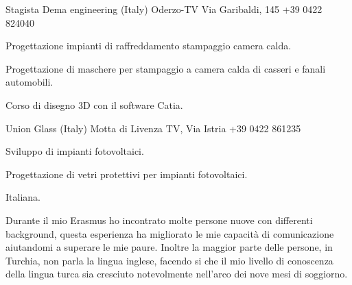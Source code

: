 \documentclass[italian,a4paper]{europasscv}
\begin{document}
\begin{europasscv}
		 {
			Stagista
		}
		\ecvitem{} {
			Dema engineering (Italy) Oderzo-TV Via Garibaldi, 145
			\newline +39 0422 824040
			\newline {}
		}
		\ecvitem{} {
			\begin{ecvitemize}
				\item Progettazione impianti di raffreddamento stampaggio
					camera calda.
				\item Progettazione di maschere per stampaggio a camera calda di
					casseri e fanali automobili.
				\item Corso di disegno 3D con il software Catia.
			\end{ecvitemize}
		}

		\ecvitem{} {
			Union Glass (Italy) Motta di Livenza TV, Via Istria
			\newline +39 0422 861235
			\newline {}
		}

		\ecvitem{} {
			\begin{ecvitemize}
				\item Sviluppo di impianti fotovoltaici.
				\item Progettazione di vetri protettivi per impianti
					fotovoltaici.
			\end{ecvitemize}
		}



		 {
			Italiana.
		}
		\ecvlanguageheader
		\ecvlanguagefooter

		 {
			\begin{ecvitemize}
				\item Durante il mio Erasmus ho incontrato molte persone nuove
					con differenti background, questa esperienza ha migliorato
					le mie capacità di comunicazione aiutandomi a superare le
					mie paure.  Inoltre la maggior parte delle persone, in
					Turchia, non parla la lingua inglese, facendo si che il
					mio livello di conoscenza della lingua turca sia cresciuto
					notevolmente nell'arco dei nove mesi di soggiorno.
			\end{ecvitemize}
		}


\end{europasscv}
\end{document}
